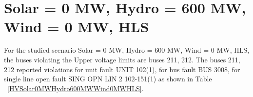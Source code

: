 \documentclass[10pt]{report}
\begin{document}
\section{Solar = 0 MW, Hydro = 600 MW, Wind = 0 MW, HLS}
For the studied scenario Solar = 0 MW, Hydro = 600 MW, Wind = 0 MW, HLS, the buses violating the Upper voltage limits are buses 211, 212.
The buses 211, 212 reported violations for unit fault UNIT 102(1), for bus fault BUS 3008, for single line open fault SING OPN LIN   2 102-151(1) as shown in Table ~\ref{HVSolar0MWHydro600MWWind0MWHLS}.
\begin{table}[H]
\caption{Contingencies reporting bus voltages greater than emergency voltage of 1.1 PU for scenario Solar = 0 MW, Hydro = 600 MW, Wind = 0 MW, HLS}
\label{HVSolar0MWHydro600MWWind0MWHLS}
\centering
{}
\end{table}
\end{document}
